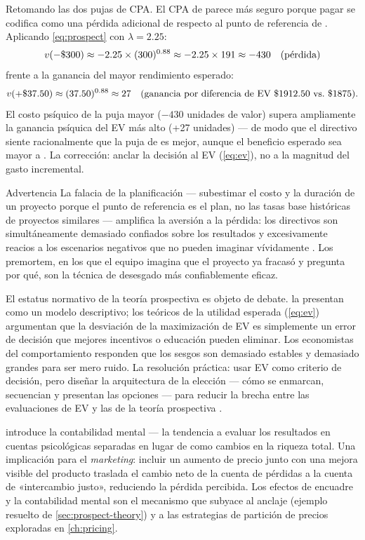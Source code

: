 \begin{example}
Retomando las dos pujas de CPA. El CPA de  parece más seguro porque pagar 
se codifica como una pérdida adicional de  respecto al punto de referencia de .
Aplicando \cref{eq:prospect} con \(\lambda=2.25\):
\[
  v(-\$\num{300}) \approx -2.25\times(300)^{0.88} \approx -2.25\times191 \approx -430
  \quad\text{(pérdida)}
\]
frente a la ganancia del mayor rendimiento esperado:
\[
  v(+\money{37.50}) \approx (37.50)^{0.88} \approx 27
  \quad\text{(ganancia por diferencia de EV \money{1912.50} vs.\ \money{1875})}.
\]
El costo psíquico de la puja mayor (\(-430\) unidades de valor) supera ampliamente la ganancia
psíquica del EV más alto (+27 unidades) --- de modo que el directivo siente racionalmente que la
puja de  es mejor, aunque el beneficio esperado sea mayor a . La corrección:
anclar la decisión al EV (\cref{eq:ev}), no a la magnitud del gasto incremental.
\end{example}

\begin{admonition}{Advertencia}
La falacia de la planificación --- subestimar el costo y la duración de un proyecto porque el punto
de referencia es el plan, no las tasas base históricas de proyectos similares --- amplifica la
aversión a la pérdida: los directivos son simultáneamente demasiado confiados sobre los resultados
y excesivamente reacios a los escenarios negativos que no pueden imaginar vívidamente
\parencite{tversky1974judgment}. Los premortem, en los que el equipo imagina que el proyecto ya
fracasó y pregunta por qué, son la técnica de desesgado más confiablemente eficaz.
\end{admonition}

El estatus normativo de la teoría prospectiva es objeto de debate. \textcite{kahneman1979prospect}
la presentan como un modelo descriptivo; los teóricos de la utilidad esperada (\cref{eq:ev}) argumentan
que la desviación de la maximización de EV es simplemente un error de decisión que mejores incentivos
o educación pueden eliminar. Los economistas del comportamiento responden que los sesgos son demasiado
estables y demasiado grandes para ser mero ruido. La resolución práctica: usar EV como criterio de
decisión, pero diseñar la arquitectura de la elección --- cómo se enmarcan, secuencian y presentan
las opciones --- para reducir la brecha entre las evaluaciones de EV y las de la teoría prospectiva
\parencite{kahneman2011}.

\textcite{thaler1985mental} introduce la contabilidad mental --- la tendencia a evaluar los resultados
en cuentas psicológicas separadas en lugar de como cambios en la riqueza total. Una implicación para
el \emph{marketing}: incluir un aumento de precio junto con una mejora visible del producto traslada
el cambio neto de la cuenta de pérdidas a la cuenta de «intercambio justo», reduciendo la pérdida
percibida. Los efectos de encuadre y la contabilidad mental son el mecanismo que subyace al anclaje
(ejemplo resuelto de \cref{sec:prospect-theory}) y a las estrategias de partición de precios
exploradas en \cref{ch:pricing}.

